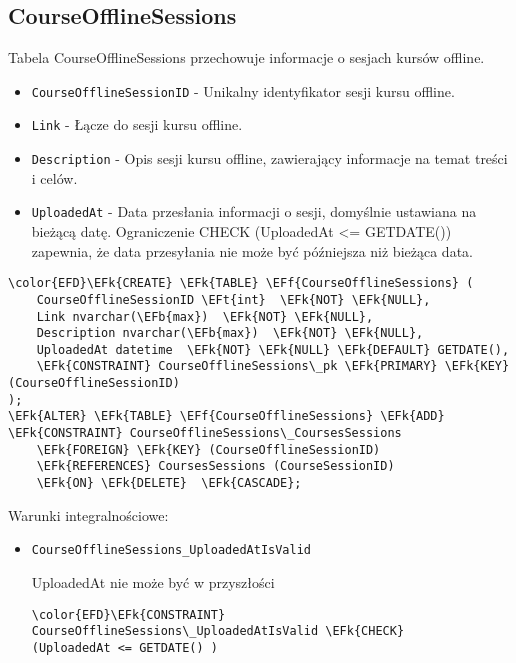 \documentclass[11pt]{article}
\newcommand{\EFk}[1]{\textcolor{EFk}{\textbf{#1}}} %
\newcommand{\EFb}[1]{\textcolor{EFb}{\textbf{#1}}} %
\newcommand{\EFf}[1]{\textcolor{EFf}{#1}} %
\newcommand{\EFt}[1]{\textcolor{EFt}{\textbf{#1}}} %
\begin{document}
\subsection{CourseOfflineSessions}
\label{sec:org2f55d3f}
Tabela CourseOfflineSessions przechowuje informacje o sesjach kursów offline.
\begin{itemize}
\item \texttt{CourseOfflineSessionID} - Unikalny identyfikator sesji kursu offline.
\item \texttt{Link} - Łącze do sesji kursu offline.
\item \texttt{Description} - Opis sesji kursu offline, zawierający informacje na temat treści i celów.
\item \texttt{UploadedAt} - Data przesłania informacji o sesji, domyślnie ustawiana na bieżącą datę. Ograniczenie CHECK (UploadedAt <= GETDATE()) zapewnia, że data przesyłania nie może być późniejsza niż bieżąca data.
\end{itemize}
\begin{Code}
\begin{Verbatim}
\color{EFD}\EFk{CREATE} \EFk{TABLE} \EFf{CourseOfflineSessions} (
    CourseOfflineSessionID \EFt{int}  \EFk{NOT} \EFk{NULL},
    Link nvarchar(\EFb{max})  \EFk{NOT} \EFk{NULL},
    Description nvarchar(\EFb{max})  \EFk{NOT} \EFk{NULL},
    UploadedAt datetime  \EFk{NOT} \EFk{NULL} \EFk{DEFAULT} GETDATE(),
    \EFk{CONSTRAINT} CourseOfflineSessions\_pk \EFk{PRIMARY} \EFk{KEY}  (CourseOfflineSessionID)
);
\EFk{ALTER} \EFk{TABLE} \EFf{CourseOfflineSessions} \EFk{ADD} \EFk{CONSTRAINT} CourseOfflineSessions\_CoursesSessions
    \EFk{FOREIGN} \EFk{KEY} (CourseOfflineSessionID)
    \EFk{REFERENCES} CoursesSessions (CourseSessionID)
    \EFk{ON} \EFk{DELETE}  \EFk{CASCADE};
\end{Verbatim}
\end{Code}
Warunki integralnościowe:


\begin{itemize}
\item \texttt{CourseOfflineSessions\_UploadedAtIsValid}

UploadedAt nie może być w przyszłości
\begin{Code}
\begin{Verbatim}
\color{EFD}\EFk{CONSTRAINT} CourseOfflineSessions\_UploadedAtIsValid \EFk{CHECK}
(UploadedAt <= GETDATE() )
\end{Verbatim}
\end{Code}
\end{itemize}
\end{document}
